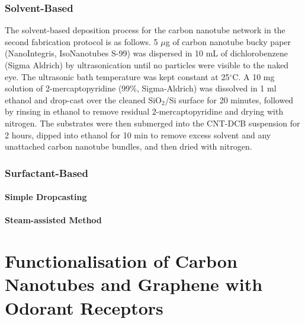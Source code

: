 \documentclass[
  a4paper,
]{scrbook}
\begin{document}
\hypertarget{solvent-based}{%
\subsection{Solvent-Based}\label{solvent-based}}

The solvent-based deposition process for the carbon nanotube network in
the second fabrication protocol is as follows. 5 \(\mu\)g of carbon
nanotube bucky paper (NanoIntegris, IsoNanotubes S-99) was dispersed in
10 mL of dichlorobenzene (Sigma Aldrich) by ultrasonication until no
particles were visible to the naked eye. The ultrasonic bath temperature
was kept constant at 25\(^\circ\)C. A 10 mg solution of
2-mercaptopyridine (99\%, Sigma-Aldrich) was dissolved in 1 ml ethanol
and drop-cast over the cleaned SiO\(_2\)/Si surface for 20 minutes,
followed by rinsing in ethanol to remove residual \(2\)-mercaptopyridine
and drying with nitrogen. The substrates were then submerged into the
CNT-DCB suspension for 2 hours, dipped into ethanol for 10 min to remove
excess solvent and any unattached carbon nanotube bundles, and then
dried with nitrogen.

\hypertarget{surfactant-based}{%
\subsection{Surfactant-Based}\label{surfactant-based}}

\hypertarget{simple-dropcasting}{%
\subsubsection*{Simple Dropcasting}\label{simple-dropcasting}}

\hypertarget{steam-assisted-method}{%
\subsubsection*{Steam-assisted Method}\label{steam-assisted-method}}


\hypertarget{functionalisation-of-carbon-nanotubes-and-graphene-with-odorant-receptors}{%
\chapter{Functionalisation of Carbon Nanotubes and Graphene with Odorant
Receptors}\label{functionalisation-of-carbon-nanotubes-and-graphene-with-odorant-receptors}}
\end{document}
